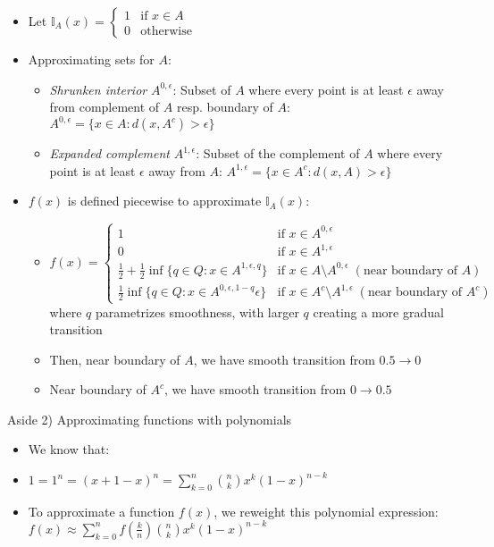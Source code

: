 \begin{itemize}
    \item Let $\mathbb{I}_A(x) = 
    \begin{cases} 
    1 & \text{if } x \in A \\
    0 & \text{otherwise}
    \end{cases}$
    \item Approximating sets for $A$:
    \begin{itemize}
        \item \emph{Shrunken interior} $A^{0,\epsilon}$: Subset of $A$ where every point is at least $\epsilon$ away from complement of $A$ resp. boundary of $A$: $A^{0,\epsilon} = \{ x \in A : d(x, A^c) > \epsilon \}$
        \item \emph{Expanded complement} $A^{1,\epsilon}$: Subset of the complement of $A$ where every point is at least $\epsilon$ away from $A$: $A^{1,\epsilon} = \{ x \in A^c : d(x, A) > \epsilon \}$
    \end{itemize}
    \item $f(x)$ is defined piecewise to approximate $\mathbb{I}_A(x)$:
    \begin{itemize}
        \item $f(x) =
        \begin{cases} 
        1 & \text{if } x \in A^{0,\epsilon} \\
        0 & \text{if } x \in A^{1,\epsilon} \\
        \frac{1}{2} + \frac{1}{2} \inf\{ q \in Q : x \in A^{1,\epsilon, q} \} & \text{if } x \in A \setminus A^{0,\epsilon} \; (\text{near boundary of } A) \\
        \frac{1}{2} \inf\{ q \in Q : x \in A^{0,\epsilon, 1-q} \epsilon \} & \text{if } x \in A^{c} \setminus A^{1,\epsilon} \; (\text{near boundary of } A^c)
        \end{cases}$
        where $q$ parametrizes smoothness, with larger $q$ creating a more gradual transition
        \item Then, near boundary of $A$, we have smooth transition from $0.5 \to 0$
        \item Near boundary of $A^c$, we have smooth transition from $0 \to 0.5$
    \end{itemize}
\end{itemize}
Aside 2) Approximating functions with polynomials
\begin{itemize}
    \item We know that:
    \item $1 = 1^n = (x + 1 - x)^n = \sum_{k=0}^n \binom{n}{k} x^k (1-x)^{n-k}$
    \item To approximate a function $f(x)$, we reweight this polynomial expression: $f(x) \approx \sum_{k=0}^n f\left(\frac{k}{n}\right) \binom{n}{k} x^k (1-x)^{n-k}$
\end{itemize}